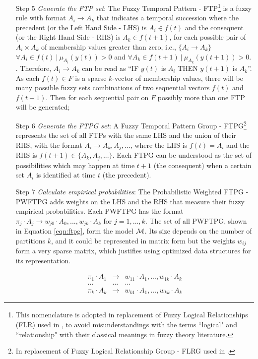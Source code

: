 \begin{enumerate}
\item[Step 5] \textit{Generate the FTP set}: The Fuzzy Temporal Pattern - FTP\footnote{This nomenclature is adopted in replacement of Fuzzy Logical Relationships (FLR) used in \cite{song1993fuzzy}, to avoid misunderstandings with the terms ``logical" and ``relationship" with their classical meanings in fuzzy theory literature.} is a fuzzy rule with format $A_i \rightarrow A_k$ that indicates a temporal succession where the precedent (or the Left Hand Side - LHS) is $A_i \in f(t)$ and the consequent (or the Right Hand Side - RHS) is $A_k \in f(t+1)$, for each possible pair of $A_i \times A_k$ of membership values greater than zero, i.e.,  $\{A_i \rightarrow A_k\}$ $\forall A_i \in f(t)\ |\ \mu_{A_i}(y(t)) > 0$ and $\forall A_k \in f(t+1)\ |\ \mu_{A_k}(y(t+1)) > 0 $. . Therefore, $A_i \rightarrow A_k$ can be read as ``IF $y(t)$ is $A_i$ THEN $y(t+1)$ is $A_k$''.
As each $f(t) \in F$ is a sparse $k$-vector of membership values, there will be many possible fuzzy sets combinations of two sequential vectors $f(t)$ and $f(t+1)$. Then for each sequential pair on $F$ possibly more than one FTP will be generated;

\item[Step 6] \textit{Generate the FTPG set}: A Fuzzy Temporal Pattern Group - FTPG\footnote{In replacement of Fuzzy Logical Relationship Group - FLRG used in \cite{Chen2006}.} represents the set of all FTPs with the same LHS and the union of their RHS, with the format $A_i \rightarrow A_k, A_j,...$, where the LHS is $f(t) = A_i$ and the RHS is $f(t+1) \in \{A_k, A_j,...\}$. Each FTPG can be understood as the set of possibilities which may happen at time $t+1$ (the consequent) when a certain set $A_i$ is identified at time $t$ (the precedent).

\item[Step 7] \textit{Calculate empirical probabilities}: The Probabilistic Weighted FTPG - PWFTPG adds weights on the LHS and the RHS that measure their fuzzy empirical probabilities. Each PWFTPG has the format $\pi_j \cdot A_j \rightarrow  w_{j0} \cdot A_0, ..., w_{jk} \cdot A_k$ for $j = 1,\ldots, k$. The set of all  PWFTPG, shown in Equation \eqref{eqn:ftpg}, form the model $\mathcal{M}$. Its size depends on the number of partitions $k$, and it could be represented in matrix form but the weights $w_{ij}$ form a very sparse matrix, which justifies using optimized data structures for its representation.

\begin{equation}
\begin{array}{rcl}
\pi_1 \cdot A_1 & \rightarrow &  w_{11} \cdot A_1, ..., w_{1k} \cdot A_k \\
\ldots & \ldots & \ldots \\
\pi_k \cdot A_k & \rightarrow &  w_{k1} \cdot A_1, ..., w_{kk} \cdot A_k
\end{array}
\label{eqn:ftpg}
\end{equation}


\end{enumerate}
